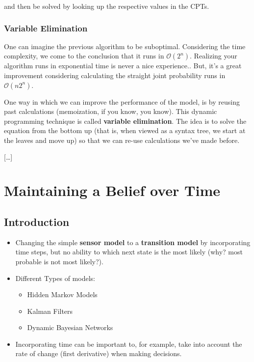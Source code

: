 \documentclass[
]{book}
\providecommand{\tightlist}{%
  \setlength{\itemsep}{0pt}\setlength{\parskip}{0pt}}
\begin{document}
and then be solved by looking up the respective values in the CPTs.

\hypertarget{variable-elimination}{%
\subsection{Variable Elimination}\label{variable-elimination}}

One can imagine the previous algorithm to be suboptimal. Considering the
time complexity, we come to the conclusion that it runs in
\(\mathcal{O}(2^n)\). Realizing your algorithm runs in exponential time
is never a nice experience.. But, it's a great improvement considering
calculating the straight joint probability runs in
\(\mathcal{O}(n2^n)\).

One way in which we can improve the performance of the model, is by
reusing past calculations (memoization, if you know, you know). This
dynamic programming technique is called \textbf{variable elimination}.
The idea is to solve the equation from the bottom up (that is, when
viewed as a syntax tree, we start at the leaves and move up) so that we
can re-use calculations we've made before.

{[}\ldots{]}

\hypertarget{maintaining-a-belief-over-time}{%
\chapter{Maintaining a Belief over
Time}\label{maintaining-a-belief-over-time}}

\hypertarget{introduction-1}{%
\section{Introduction}\label{introduction-1}}

\begin{itemize}
\tightlist
\item
  Changing the simple \textbf{sensor model} to a \textbf{transition
  model} by incorporating time steps, but no ability to which next state
  is the most likely (why? most probable is not most likely?).
\item
  Different Types of models:

  \begin{itemize}
  \tightlist
  \item
    Hidden Markov Models
  \item
    Kalman Filters
  \item
    Dynamic Bayesian Networks
  \end{itemize}
\item
  Incorporating time can be important to, for example, take into account
  the rate of change (first derivative) when making decisions.
\end{itemize}
\end{document}

